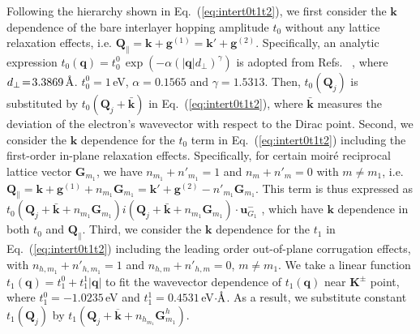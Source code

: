 \documentclass[aps,prx,10pt,twocolumn,superscriptaddress]{revtex4}
\def\angstrom{\mbox{\normalfont\AA}}
\def\Red#1{\textcolor{red}{#1}}
\def\Blue#1{\textcolor{blue}{#1}}
\def\angstrom{\mbox{\normalfont\AA}}
\begin{document}
Following the hierarchy shown in Eq.~(\ref{eq:intert0t1t2}),  
we first consider the $\textbf{k}$ dependence of the bare interlayer hopping amplitude $t_0$ without any lattice relaxation effects, i.e. $\textbf{Q}_{\parallel}\!=\!\textbf{k}+\textbf{g}^{(1)}=\textbf{k}'+\textbf{g}^{(2)}$. Specifically, an analytic expression $t_{0}(\textbf{q})\!=\!t^{0}_{0}\,\exp(-\alpha(\left|\textbf{q}\right|d_{\perp})^{\gamma})$ is  adopted from Refs.~ , where 
$d_{\perp}\!=\!3.3869\,\angstrom$. $t^{0}_{0}\!=\!1\,$eV, $\alpha\!=\!0.1565$ and $\gamma\!=\!1.5313$. Then, $t_{0}(\mathbf{Q}_j)$ is substituted by $t_{0}(\textbf{Q}_{j}+\bar{\textbf{k}})$ in Eq.~(\ref{eq:intert0t1t2}), where $\bar{\mathbf{k}}$ measures the deviation of the electron's wavevector with respect to the Dirac point. Second, we consider the $\textbf{k}$ dependence for the $t_0$ term in Eq.~(\ref{eq:intert0t1t2}) including the first-order in-plane relaxation effects. Specifically, for certain moir\'e reciprocal lattice vector $\textbf{G}_{m_{1}}$, we have $n_{m_{1}}+n'_{m_{1}}\!=\!1$ and $n_{m}+n'_{m}\!=\!0$ with $m\!\neq\!m_{1}$, i.e. $\textbf{Q}_{\parallel}\!=\!\textbf{k}+\textbf{g}^{(1)}+n_{m_{1}}\textbf{G}_{m_{1}}=\textbf{k}'+\textbf{g}^{(2)}-n'_{m_{1}}\textbf{G}_{m_{1}}$. This term is thus expressed as $t_{0}(\textbf{Q}_{j}+\bar{\textbf{k}}+n_{m_{1}}\textbf{G}_{m_{1}})i(\textbf{Q}_{j}+\bar{\textbf{k}}+n_{m_{1}}\textbf{G}_{m_{1}})\cdot\textbf{u}^{-}_{G_{1}}$ , which have $\textbf{k}$ dependence in both $t_{0}$ and $\textbf{Q}_{\parallel}$. 
Third, we consider the $\textbf{k}$ dependence for the $t_{1}$ in Eq.~(\ref{eq:intert0t1t2}) including the leading order out-of-plane corrugation effects, with  $n_{h,m_{1}}+n'_{h,m_{1}}\!=\!1$ and $n_{h,m}+n'_{h,m}\!=\!0$, $m\!\neq\!m_{1}$. We take a linear function $t_{1}(\textbf{q})\!=\!t^{0}_{1}+t^{1}_{1}\left|\textbf{q}\right|$ to fit the wavevector dependence of $t_{1}(\mathbf{q})$ near $\textbf{K}^{\pm}$ point, where $t^{0}_{1}=-1.0235\,$eV  and $t^{1}_{1}\!=\!0.4531\,$eV$\cdot\angstrom$.  As a result, we substitute constant $t_{1}(\mathbf{Q}_j)$ by $t_{1}(\textbf{Q}_{j}+\overline{\textbf{k}}+n_{h_{m_{1}}}\textbf{G}^{h}_{m_{1}})$.%
\end{document}
